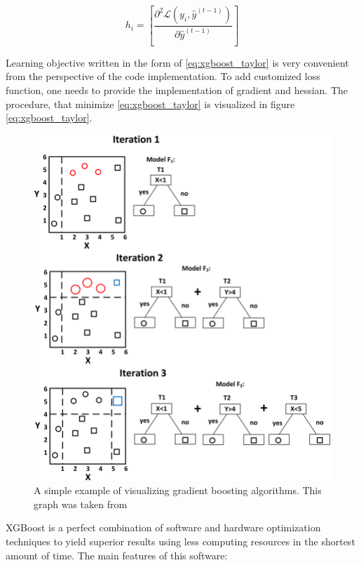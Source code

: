 \begin{equation}
    h_i = \left[\frac{\partial^2 \mathcal{L}(y_{i},\hat{y}^{(t-1)})}{\partial \hat{y}^{(t-1)}} \right]
\end{equation}

Learning objective written in the form of \ref{eq:xgboost_taylor} is very convenient from the perspective of the code implementation. To add customized loss function, one needs to provide the implementation of gradient and hessian. The procedure, that minimize \ref{eq:xgboost_taylor} is visualized in figure \ref{eq:xgboost_taylor}. 

\begin{figure}
\centering
\includegraphics[scale=0.8]{figures/GB_visualization.png}
\caption{A simple example of visualizing gradient boosting algorithms.
This graph was taken from \cite{GB_visualization}
\label{fig:GB_visualization}}
\end{figure}
  
XGBoost is a perfect combination of software and hardware optimization techniques to yield superior results using less computing resources in the shortest amount of time. The main features of this software: 

